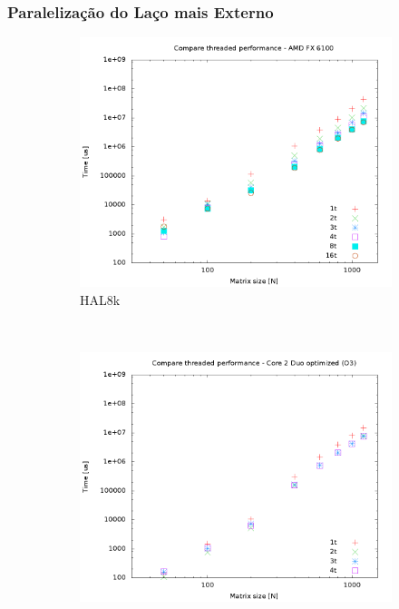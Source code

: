 \documentclass[a4paper, 12pt]{article}
\begin{document}
\subsubsection{Paralelização do Laço mais Externo}
\begin{figure}[H]
    \centering
    \begin{subfigure}[H]{0.5\textwidth}
        \includegraphics[width=\textwidth]{HAL_par_threads}
        \caption{HAL8k}
        \label{fig:8k_par_threads}
    \end{subfigure}%
    ~ %
    \begin{subfigure}[H]{0.5\textwidth}
        \includegraphics[width=\textwidth]{hpops2_O3_par_threads}

\end{subfigure}
\end{figure}
\end{document}
